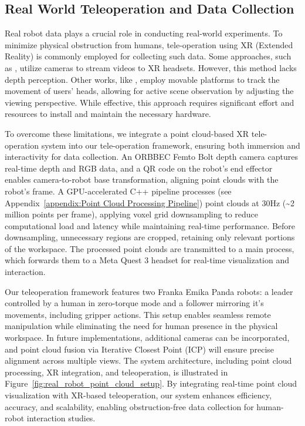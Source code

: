 
\subsection{Real World Teleoperation and Data Collection}
\label{sec:real_world_teleop}

Real robot data plays a crucial role in conducting real-world experiments. To minimize physical obstruction from humans, tele-operation using XR (Extended Reality) is commonly employed for collecting such data.
Some approaches, such as \cite{openteach}, utilize cameras to stream videos to XR headsets. However, this method lacks depth perception. Other works, like \cite{opentelevision}, employ movable platforms to track the movement of users' heads, allowing for active scene observation by adjusting the viewing perspective. While effective, this approach requires significant effort and resources to install and maintain the necessary hardware.

To overcome these limitations, we integrate a point cloud-based XR tele-operation system into our tele-operation framework, ensuring both immersion and interactivity for data collection. An ORBBEC Femto Bolt depth camera captures real-time depth and RGB data, and a QR code on the robot’s end effector enables camera-to-robot base transformation, aligning point clouds with the robot’s frame. A GPU-accelerated C++ pipeline processes (see Appendix~\ref{appendix:Point Cloud Processing Pipeline}) point clouds at 30Hz (\textasciitilde 2 million points per frame), applying voxel grid downsampling to reduce computational load and latency while maintaining real-time performance. Before downsampling, unnecessary regions are cropped, retaining only relevant portions of the workspace. The processed point clouds are transmitted to a main process, which forwards them to a Meta Quest 3 headset for real-time visualization and interaction.



Our teleoperation framework features two Franka Emika Panda \cite{Franka_Emika_Robot} robots: a leader controlled by a human in zero-torque mode and a follower mirroring it's movements, including gripper actions. This setup enables seamless remote manipulation while eliminating the need for human presence in the physical workspace. In future implementations, additional cameras can be incorporated, and point cloud fusion via Iterative Closest Point (ICP) will ensure precise alignment across multiple views. The system architecture, including point cloud processing, XR integration, and teleoperation, is illustrated in Figure~\ref{fig:real_robot_point_cloud_setup}. By integrating real-time point cloud visualization with XR-based teleoperation, our system enhances efficiency, accuracy, and scalability, enabling obstruction-free data collection for human-robot interaction studies.



